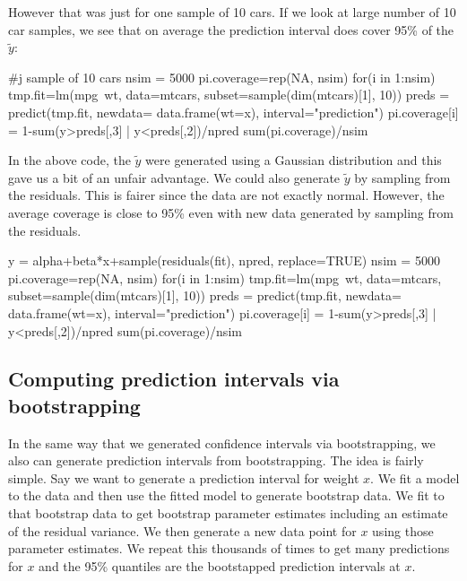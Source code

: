 However that was just for one sample of 10 cars.  If we look at large number of 10 car samples, we see that on average the prediction interval does cover 95\% of the $\tilde{y}$:
\begin{Schunk}
\begin{Sinput}
 #j sample of 10 cars
 nsim = 5000
 pi.coverage=rep(NA, nsim)
 for(i in 1:nsim){
   tmp.fit=lm(mpg~wt, data=mtcars, subset=sample(dim(mtcars)[1], 10))
   preds = predict(tmp.fit, newdata= data.frame(wt=x), interval="prediction")
   pi.coverage[i] = 1-sum(y>preds[,3] | y<preds[,2])/npred
 }
 sum(pi.coverage)/nsim
\end{Sinput}
\end{Schunk}
In the above code, the $\tilde{y}$ were generated using a Gaussian distribution and this gave us a bit of an unfair advantage.  We could also generate $\tilde{y}$ by sampling from the residuals.  This is fairer since the data are not exactly normal. However, the average coverage is close to 95\% even with new data generated by sampling from the residuals.
\begin{Schunk}
\begin{Sinput}
 y = alpha+beta*x+sample(residuals(fit), npred, replace=TRUE)
 nsim = 5000
 pi.coverage=rep(NA, nsim)
 for(i in 1:nsim){
   tmp.fit=lm(mpg~wt, data=mtcars, subset=sample(dim(mtcars)[1], 10))
   preds = predict(tmp.fit, newdata= data.frame(wt=x), interval="prediction")
   pi.coverage[i] = 1-sum(y>preds[,3] | y<preds[,2])/npred
 }
 sum(pi.coverage)/nsim
\end{Sinput}
\end{Schunk}

\subsection{Computing prediction intervals via bootstrapping}
In the same way that we generated confidence intervals via bootstrapping, we also can generate prediction intervals from bootstrapping. The idea is fairly simple.  Say we want to generate a prediction interval for weight $x$.  We fit a model to the data and then use the fitted model to generate bootstrap data. We fit to that bootstrap data to get bootstrap parameter estimates including an estimate of the residual variance. We then generate a new data point for $x$ using those parameter estimates.  We repeat this thousands of times to get many predictions for $x$ and the 95\% quantiles are the bootstapped prediction intervals at $x$.  



